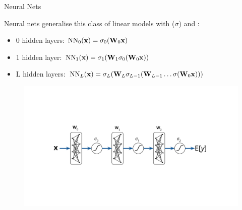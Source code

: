\documentclass[lualatex, aspectratio=169]{beamer}
\begin{document}
\begin{frame}{Neural Nets}
  
  Neural nets generalise this class of linear models with  ($\sigma$) and :
  \begin{itemize}
    \item 0 hidden layers: $\text{NN}_{0} ({\mathbf{x}}) = \sigma_0( \mathbf{W}_0\mathbf{x} )$
    \item 1 hidden layer: $\text{NN}_{1} ({\mathbf{x}}) = \sigma_1(\mathbf{W}_1 \sigma_0( \mathbf{W}_0 \mathbf{x} ))$
    \item L hidden layers: $\text{NN}_{L} ({\mathbf{x}}) = \sigma_L(\mathbf{W}_L \sigma_{L-1}(\mathbf{W}_{L-1} \ldots \sigma( \mathbf{W}_0 \mathbf{x} )))$
  \end{itemize}

  \begin{figure}
    \includegraphics[page=1, trim={3cm 4.5cm 3.5cm 4.5cm}, clip, width=0.5\pagewidth]{assets/pictures.pdf}
  \end{figure}
  
\end{frame}
\end{document}
